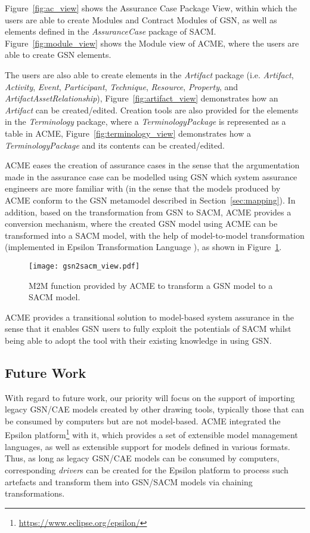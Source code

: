 Figure~\ref{fig:ac_view} shows the Assurance Case Package View, within which the users are able to create Modules and Contract Modules of GSN, as well as elements defined in the \textit{AssuranceCase} package of SACM. 
Figure~\ref{fig:module_view} shows the Module view of ACME, where the users are able to create GSN elements. 

The users are also able to create elements in the \textit{Artifact} package (i.e. \textit{Artifact}, \textit{Activity}, \textit{Event}, \textit{Participant}, \textit{Technique}, \textit{Resource}, \textit{Property}, and \textit{ArtifactAssetRelationship}), Figure~\ref{fig:artifact_view} demonstrates how an \textit{Artifact} can be created/edited. 
Creation tools are also provided for the elements in the \textit{Terminology} package, where a \textit{TerminologyPackage} is represented as a table in ACME, Figure~\ref{fig:terminology_view} demonstrates how a \textit{TerminologyPackage} and its contents can be created/edited.

ACME eases the creation of assurance cases in the sense that the argumentation made in the assurance case can be modelled using GSN which system assurance engineers are more familiar with (in the sense that the models produced by ACME conform to the GSN metamodel described in Section~\ref{sec:mapping}). 
In addition, based on the transformation from GSN to SACM, ACME provides a conversion mechanism, where the created GSN model using ACME can be transformed into a SACM model, with the help of model-to-model transformation (implemented in Epsilon Transformation Language \cite{kolovos2008epsilon}), as shown in Figure~\ref{fig:transformation_view}.

\begin{figure}
	\centering
	\texttt{[image: gsn2sacm\_view.pdf]}
	\caption{M2M function provided by ACME to transform a GSN model to a SACM model.}
	\label{fig:transformation_view}
\end{figure}

ACME provides a transitional solution to model-based system assurance in the sense that it enables GSN users to fully exploit the potentials of SACM whilst being able to adopt the tool with their existing knowledge in using GSN. 

\subsection{Future Work}
With regard to future work, our priority will focus on the support of importing legacy GSN/CAE models created by other drawing tools, typically those that can be consumed by computers but are not model-based. 
ACME integrated the Epsilon platform\footnote{\url{https://www.eclipse.org/epsilon/}} with it, which provides a set of extensible model management languages, as well as extensible support for models defined in various formats.
Thus, as long as legacy GSN/CAE models can be consumed by computers, corresponding \textit{driver}s can be created for the Epsilon platform to process such artefacts and transform them into GSN/SACM models via chaining transformations.

